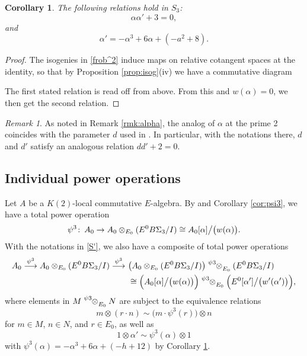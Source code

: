 \documentclass{gtpart}
\newtheorem{cor}[thm]{Corollary}
\theoremstyle{definition}
\theoremstyle{remark}
\newtheorem{rmk}[thm]{Remark}
\def\co{\colon\thinspace}
\newcommand{\A}{\alpha}
\newcommand{\p}{\psi^3}
\begin{document}
\begin{cor}
\label{cor:alpha'}
 The following relations hold in $S_3$: 
 \[
  \A \A' + 3 = 0, 
 \]
 and 
 \[
  \A' = -\A^3 + 6 \A + (-a^2 + 8).  
 \]
\end{cor}
\begin{proof}
 The isogenies in \eqref{frob^2} induce maps on relative cotangent spaces at the identity, 
 so that by Proposition \ref{prop:isog}\thinspace (iv) we have a commutative diagram 
 \begin{center}
 \end{center}
 The first stated relation is read off from above.  From this and $w(\A) = 0$, we then get the second relation.  
\end{proof}
\begin{rmk}
 As noted in Remark \ref{rmk:alpha}, the analog of $\A$ at the prime 2 coincides with the parameter $d$ used in \cite[Section 3]{h2p2}.  
 In particular, with the notations there, $d$ and $d'$ satisfy an analogous relation $d d' + 2 = 0$.  
\end{rmk}


\subsection{Individual power operations}

Let $A$ be a $K(2)$-local commutative $E$-algebra.  
By \cite[3.23]{cong} and Corollary \ref{cor:psi3}, 
we have a total power operation 
\[
 \p \co A_0 \to A_0 \otimes_{E_0} (E^0 B\Sigma_3 / I) \cong A_0 [\A] \big/ \big( w(\A) \big).  
\]
With the notations in \eqref{S'}, we also have a composite of total power operations 
\begin{equation}
\label{psi3^2}
\begin{split}
 A_0 \stackrel{\p}{\longrightarrow} A_0 \otimes_{E_0} (E^0 B\Sigma_3 / I) \stackrel{\p}{\longrightarrow} 
 & ~ \big( A_0 \otimes_{E_0} (E^0 B\Sigma_3 / I) \big) \tensor[^\p]{\otimes}{_{E_0}} (E^0 B\Sigma_3 / I) \\
 & ~ \cong \Big( A_0 [\A] \big/ \big( w(\A) \big) \Big) \tensor[^\p]{\otimes}{_{E_0}} \Big( E^0 [\A'] \big/ \big( w'(\A') \big) \Big), 
\end{split}
\end{equation}
where elements in $M \tensor[^\p]{\otimes}{_{E_0}} N$ are subject to the equivalence relations 
\[
 m \otimes (r \cdot n) \sim \big( m \cdot \p(r) \big) \otimes n 
\]
for $m \in M$, $n \in N$, and $r \in E_0$, as well as 
\[
 1 \otimes \A' \sim \p(\A) \otimes 1 
\]
with $\p(\A) = -\A^3 + 6 \A + (-h + 12)$ by Corollary \ref{cor:alpha'}.
\end{document}
